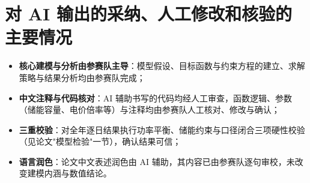 \documentclass[11pt,a4paper]{article}
\begin{document}
\section{对 AI 输出的采纳、人工修改和核验的主要情况}
\begin{itemize}
    \item \textbf{核心建模与分析由参赛队主导}：模型假设、目标函数与约束方程的建立、求解策略与结果分析均由参赛队完成；
    \item \textbf{中文注释与代码核对}：AI 辅助书写的代码均经人工审查，函数逻辑、参数（储能容量、电价倍率等）与注释均由参赛队人工核对、修改与确认；
    \item \textbf{三重校验}：对全年逐日结果执行功率平衡、储能约束与口径闭合三项硬性校验（见论文"模型检验"一节），确认结果可信；
    \item \textbf{语言润色}：论文中文表述润色由 AI 辅助，其内容已由参赛队逐句审校，未改变建模内涵与数值结论。
\end{itemize}
\end{document}
